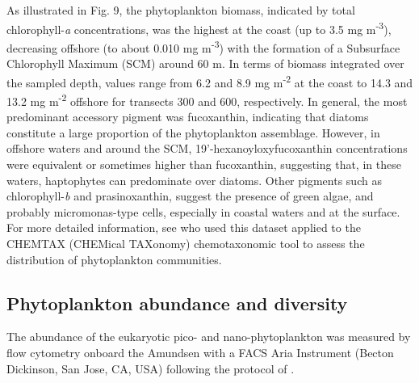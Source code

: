 \documentclass[essd, manuscript]{copernicus}
\begin{document}
As illustrated in Fig. 9, the phytoplankton biomass, indicated by total chlorophyll-\textit{a} concentrations, was the highest at the coast (up to 3.5 mg m\textsuperscript{-3}), decreasing offshore (to about 0.010 mg m\textsuperscript{-3})  with the formation of a Subsurface Chlorophyll Maximum (SCM) around 60 m. In terms of biomass integrated over the sampled depth, values range from 6.2 and 8.9 mg m\textsuperscript{-2} at the coast to 14.3 and 13.2 mg m\textsuperscript{-2} offshore for transects 300 and 600, respectively. In general, the most predominant accessory pigment was fucoxanthin, indicating that diatoms constitute a large proportion of the phytoplankton assemblage. However, in offshore waters and around the SCM, 19’-hexanoyloxyfucoxanthin concentrations were equivalent or sometimes higher than fucoxanthin, suggesting that, in these waters, haptophytes can predominate over diatoms. Other pigments such as chlorophyll-\textit{b} and prasinoxanthin, suggest the presence of green algae, and probably micromonas-type cells, especially in coastal waters and at the surface. For more detailed information, see \citet{Coupel2015} who used this dataset applied to the CHEMTAX (CHEMical TAXonomy) chemotaxonomic tool to assess the distribution of phytoplankton communities.

\subsection{Phytoplankton abundance and diversity}

The abundance of the eukaryotic pico- and nano-phytoplankton was measured by flow cytometry onboard the Amundsen with a FACS Aria Instrument (Becton Dickinson, San Jose, CA, USA) following the protocol of \citet{Marie1999}. 
\end{document}
